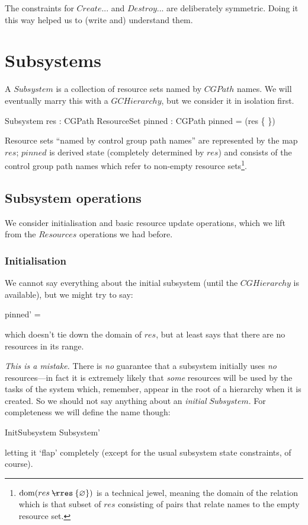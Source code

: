 \documentclass[a4paper,twoside,12pt]{article}
\begin{document}
The constraints for $Create$... and $Destroy$... are deliberately symmetric.
Doing it this way helped us to (write and) understand them.

\section{Subsystems}

A $Subsystem$ is a collection of resource sets named by $CGPath$ names. We will eventually marry
this with a $GCHierarchy$, but we consider it in isolation first.
\begin{schema}{Subsystem}
res : CGPath \ffun ResourceSet
\also
pinned : \finset CGPath
\where
pinned = \dom(res \nrres \{ \emptyset \})
\end{schema}
Resource sets ``named by control group path names'' are represented by the map $res$; 
$pinned$ is derived state (completely determined by $res$) and consists of the control group path 
names which refer to non-empty resource sets\footnote{$\dom(res \nrres \{ \emptyset \})$ 
is a technical jewel, meaning the domain
of the relation which is that subset of $res$ consisting of pairs that relate names to the empty
resource set.}.

\subsection{Subsystem operations}
We consider initialisation
and basic resource update operations, which we lift from the $Resources$ operations we had before.

\subsubsection{Initialisation}
We cannot say everything about the initial subsystem (until the $CGHierarchy$ is available), but we might try to
say:
\begin{zed}
pinned' = \emptyset
\end{zed}
which doesn't tie down the domain of $res$, but at least says that there are no resources in its range.

\emph{This is a mistake.}  
There is \emph{no} guarantee that a subsystem initially uses \emph{no} resources---in fact it is
extremely likely that \emph{some} resources will be used by the tasks of the system which, remember, appear in the 
root of a hierarchy when
it is created. So we should not say anything about an \emph{initial} $Subsystem$. 
For completeness we will define the name though:
\begin{zed}
InitSubsystem  Subsystem'
\end{zed}
letting it `flap' completely (except for the usual subsystem state constraints, of course).
\end{document}
